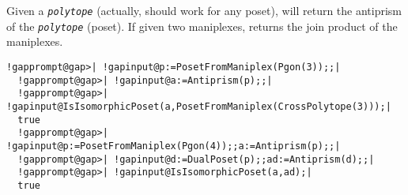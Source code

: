\documentclass[a4paper,11pt]{report}
\begin{document}
{{{ Given a \mbox{\texttt{\mdseries\slshape polytope}} (actually, should work for any poset), will return the antiprism of the \mbox{\texttt{\mdseries\slshape polytope}} (poset). If given two maniplexes, returns the join product of the maniplexes. }

 
\begin{Verbatim}[commandchars=!@|,fontsize=\small,frame=single,label=Example]
  !gapprompt@gap>| !gapinput@p:=PosetFromManiplex(Pgon(3));;|
  !gapprompt@gap>| !gapinput@a:=Antiprism(p);;|
  !gapprompt@gap>| !gapinput@IsIsomorphicPoset(a,PosetFromManiplex(CrossPolytope(3)));|
  true
  !gapprompt@gap>| !gapinput@p:=PosetFromManiplex(Pgon(4));;a:=Antiprism(p);;|
  !gapprompt@gap>| !gapinput@d:=DualPoset(p);;ad:=Antiprism(d);;|
  !gapprompt@gap>| !gapinput@IsIsomorphicPoset(a,ad);|
  true
\end{Verbatim}
 }

 }

   
\end{document}
